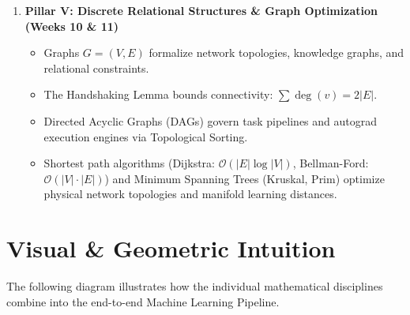 \begin{enumerate}
    \item \textbf{Pillar V: Discrete Relational Structures \& Graph Optimization (Weeks 10 \& 11)}
    \begin{itemize}
        \item Graphs $G = (V, E)$ formalize network topologies, knowledge graphs, and relational constraints.
        \item The Handshaking Lemma bounds connectivity: $\sum \deg(v) = 2|E|$.
        \item Directed Acyclic Graphs (DAGs) govern task pipelines and autograd execution engines via Topological Sorting.
        \item Shortest path algorithms (Dijkstra: $\mathcal{O}(|E| \log |V|)$, Bellman-Ford: $\mathcal{O}(|V| \cdot |E|)$) and Minimum Spanning Trees (Kruskal, Prim) optimize physical network topologies and manifold learning distances.
    \end{itemize}
\end{enumerate}

\section{Visual \& Geometric Intuition}

The following diagram illustrates how the individual mathematical disciplines combine into the end-to-end Machine Learning Pipeline.


